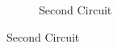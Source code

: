 \begin{figure}[H]
\begin{subfigure}{0.4\textwidth}
\caption{Second Circuit}
\label{fig:second}
\end{subfigure}
\end{figure}













